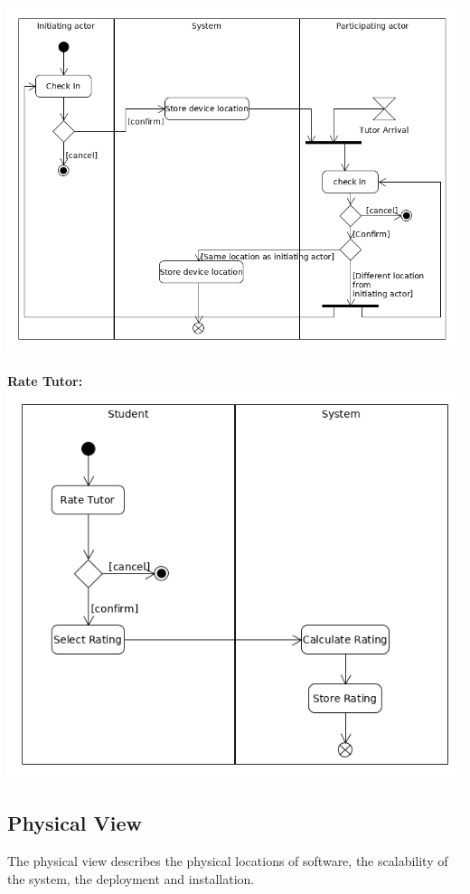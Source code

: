 \documentclass[12pt]{article}
\begin{document}
\includegraphics[width=140mm]{./activity_diagram/checked_in.png}
\\\\\textbf{Rate Tutor:}\\
\includegraphics[width=140mm]{./activity_diagram/rate_tutor.png}

\subsection{Physical View}
The physical view describes the physical locations of software, the scalability of the system, the deployment and installation.
\end{document}
